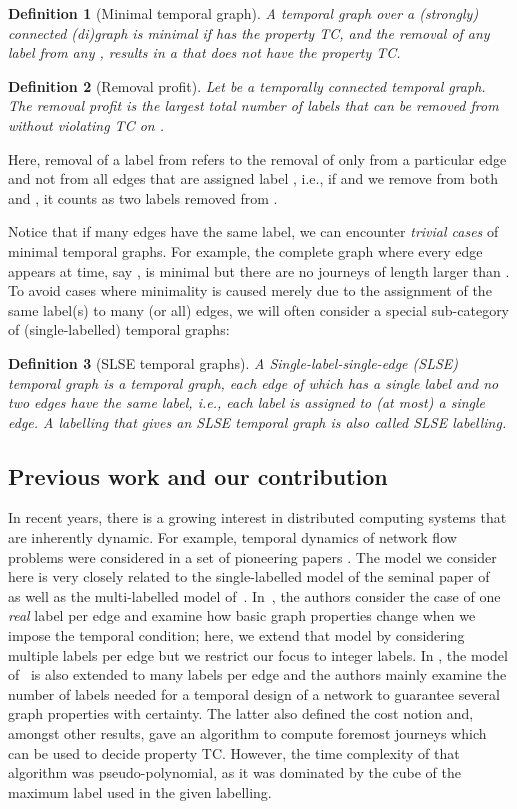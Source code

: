 \documentclass[a4paper,UKenglish]{article}
\newtheorem{definition}{Definition}
\begin{document}
\begin{definition}[Minimal temporal graph]
A temporal graph  over a (strongly) connected (di)graph is \emph{minimal} if  has the property TC, and the removal of any label from any , results in a  that \emph{does not} have the property TC.
\end{definition}
\begin{definition}[Removal profit]
Let  be a temporally connected temporal graph. The \emph{removal profit}  is the largest total number of labels that can be removed from  without violating TC on .
\end{definition}
Here, removal of a label  from  refers to the removal of  only from a particular edge and not from all edges that are assigned label , i.e., if  and we remove  from both  and , it counts as two labels removed from .


Notice that if many edges have the same label, we can encounter \emph{trivial cases} of minimal temporal graphs. For example, the complete graph where every edge appears at time, say , is minimal but there are no journeys of length larger than . To avoid cases where minimality is caused merely due to the assignment of the same label(s) to many (or all) edges, we will often consider a special sub-category of (single-labelled) temporal graphs:
\begin{definition}[SLSE temporal graphs]
A Single-label-single-edge (SLSE) temporal graph is a temporal graph, each edge of which has a single label and no two edges have the same label, i.e., each label is assigned to (at most) a single edge. A labelling that gives an SLSE temporal graph is also called \emph{SLSE labelling}.
\end{definition}




\subsection{Previous work and our contribution}\label{sec:full_paper_related}
In recent years, there is a growing interest in distributed computing systems that are inherently dynamic. For example, temporal dynamics of network flow problems were considered in a set of pioneering papers \cite{skutella1, skutella2,woeginger, tardos}. The model we consider here is very closely related to the single-labelled model of the seminal paper of~\cite{kempe} as well as the multi-labelled model of~\cite{spirakis}. In~\cite{kempe}, the authors consider the case of one \emph{real} label per edge and examine how basic graph properties change when we impose the temporal condition; here, we extend that model by considering multiple labels per edge but we restrict our focus to integer labels. In \cite{spirakis}, the model of~\cite{kempe} is also extended to many labels per edge and the authors mainly examine the number of labels needed for a temporal design of a network to guarantee several graph properties with certainty. The latter also defined the cost notion and, amongst other results, gave an algorithm to compute foremost journeys which can be used to decide property TC. However, the time complexity of that algorithm was pseudo-polynomial, as it was dominated by the cube of the maximum label used in the given labelling.
\end{document}
